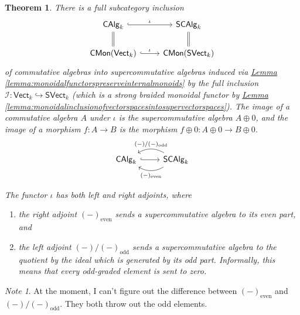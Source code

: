 \documentclass[a4paper]{report}
\theoremstyle{definition}
\theoremstyle{plain}
\newtheorem{theorem}{Theorem}[section]
\theoremstyle{remark}
\newtheorem{note}{Note}[section]
\begin{document}
\begin{theorem}
  There is a full subcategory inclusion
  \begin{equation*}
    \begin{tikzcd}
      \mathsf{CAlg}_{k}
      \arrow[d, equals]
      \arrow[r, "\iota", hookrightarrow]
      & \mathsf{SCAlg}_{k}
      \arrow[d, equals]
      \\
      \mathsf{CMon}(\mathsf{Vect}_{k}) 
      \arrow[r, "\iota", hookrightarrow]
      & \mathsf{CMon}(\mathsf{SVect}_{k})
    \end{tikzcd}
  \end{equation*}
  of commutative algebras into supercommutative algebras induced via \hyperref[lemma:monoidalfunctorspreserveinternalmonoids]{Lemma \ref*{lemma:monoidalfunctorspreserveinternalmonoids}} by the full inclusion $\mathcal{I}\colon \mathsf{Vect}_{k} \hookrightarrow \mathsf{SVect}_{k}$ (which is a strong braided monoidal functor by \hyperref[lemma:monoidalinclusionofvectorspacesintosupervectorspaces]{Lemma \ref*{lemma:monoidalinclusionofvectorspacesintosupervectorspaces}}). The image of a commutative algebra $A$ under $\iota$ is the supercommutative algebra $A \oplus 0$, and the image of a morphism $f\colon A \to B$ is the morphism $f \oplus 0\colon A \oplus 0 \to B \oplus 0$.
  \begin{equation*}
    \begin{tikzcd}
      \mathsf{CAlg}_{k}
      \arrow[r, hookrightarrow]
      & \mathsf{SCAlg}_{k}
      \arrow[l, bend left, "(-)_{\text{even}}"]
      \arrow[l, bend right, swap, "(-)/(-)_{\text{odd}}"]
    \end{tikzcd}
  \end{equation*}

  The functor $\iota$ has both left and right adjoints, where
  \begin{enumerate}
    \item the right adjoint $(-)_{\text{even}}$ sends a supercommutative algebra to its even part, and
    \item the left adjoint $(-)/(-)_{\text{odd}}$ sends a supercommutative algebra to the quotient by the ideal which is generated by its odd part. Informally, this means that every odd-graded element is sent to zero.
  \end{enumerate}
\end{theorem}
\begin{note}
  At the moment, I can't figure out the difference between $(-)_{\text{even}}$ and $(-)/(-)_{\text{odd}}$. They both throw out the odd elements.
\end{note}
\end{document}
